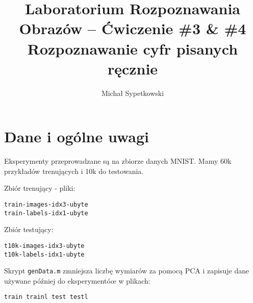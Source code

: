 \documentclass[a4paper]{article}
\begin{document}
\title{ Laboratorium Rozpoznawania Obrazów – Ćwiczenie \#3 \& \#4 Rozpoznawanie cyfr pisanych ręcznie }


\author{Michał Sypetkowski}
\maketitle


\section{Dane i ogólne uwagi}
Eksperymenty przeprowadzane są na zbiorze danych MNIST. 
Mamy 60k przykładów trenujących i 10k do testowania.

Zbiór trenujący - pliki:
\begin{verbatim}
train-images-idx3-ubyte
train-labels-idx1-ubyte
\end{verbatim}

Zbiór testujący:
\begin{verbatim}
t10k-images-idx3-ubyte
t10k-labels-idx1-ubyte
\end{verbatim}

Skrypt \texttt{genData.m} zmniejsza liczbę wymiarów za pomocą PCA
i zapisuje dane używane później do eksperymentóœ w plikach:
\begin{verbatim}
train trainl test testl
\end{verbatim}
\end{document}
